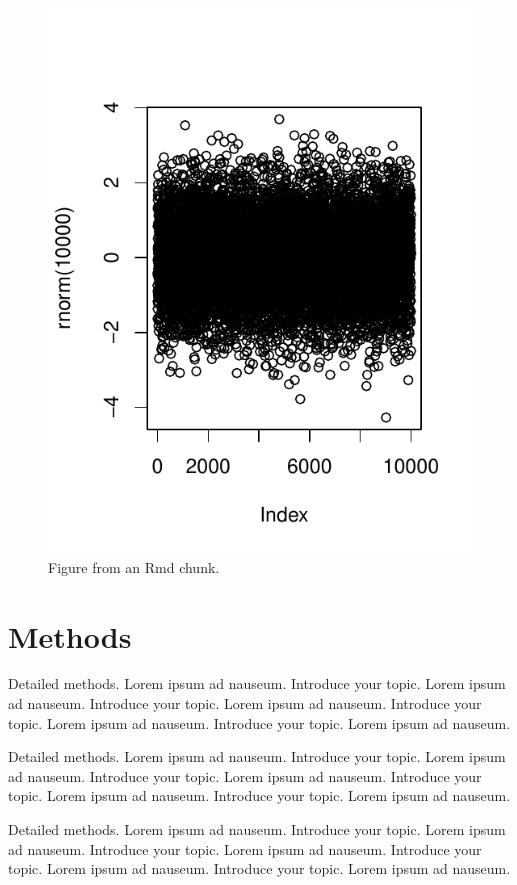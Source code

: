 \documentclass{bioinfo}
\begin{document}
\begin{figure}
\centering
\includegraphics{JBrowseR-paper_files/figure-latex/figure-1.pdf}
\caption{Figure from an Rmd chunk.}
\end{figure}

\section{Methods}

Detailed methods. Lorem ipsum ad nauseum. Introduce your topic. Lorem
ipsum ad nauseum. Introduce your topic. Lorem ipsum ad nauseum.
Introduce your topic. Lorem ipsum ad nauseum. Introduce your topic.
Lorem ipsum ad nauseum.

Detailed methods. Lorem ipsum ad nauseum. Introduce your topic. Lorem
ipsum ad nauseum. Introduce your topic. Lorem ipsum ad nauseum.
Introduce your topic. Lorem ipsum ad nauseum. Introduce your topic.
Lorem ipsum ad nauseum.

Detailed methods. Lorem ipsum ad nauseum. Introduce your topic. Lorem
ipsum ad nauseum. Introduce your topic. Lorem ipsum ad nauseum.
Introduce your topic. Lorem ipsum ad nauseum. Introduce your topic.
Lorem ipsum ad nauseum.
\end{document}
